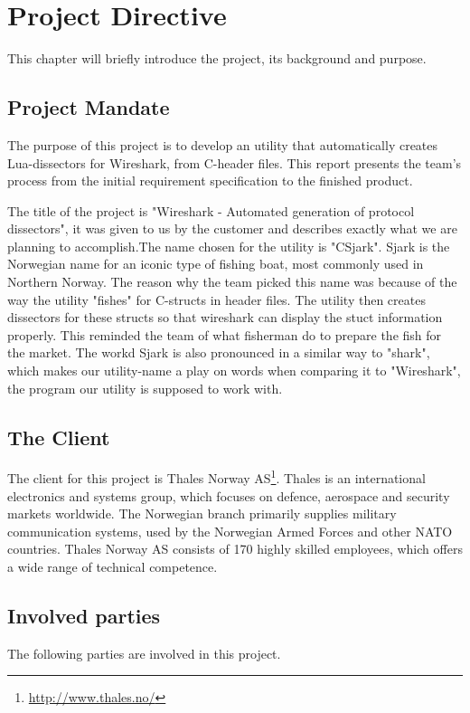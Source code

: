 \chapter{Project Directive}
This chapter will briefly introduce the project, its background and purpose.


\section{Project Mandate}
The purpose of this project is to develop an utility that automatically creates Lua-dissectors for Wireshark, from C-header files. This report presents the team’s process from the initial requirement specification to the finished product. 

The title of the project is "Wireshark - Automated generation of protocol dissectors", it was given to us by the customer and describes exactly what we are planning
to accomplish.The name chosen for the utility is "CSjark". Sjark is the Norwegian name for an iconic type of fishing boat, most commonly used in Northern Norway. The reason why the team picked this name was because of the way the utility "fishes" for C-structs in header files. The utility then creates dissectors for these structs so that wireshark can display the stuct information properly. This reminded the team of what fisherman do to prepare the fish for the market. The workd Sjark is also pronounced in a similar way to "shark", which makes our utility-name a play on words when comparing it to "Wireshark", the program our utility is supposed to work with.


\section{The Client}
The client for this project is
Thales Norway AS\footnote{\url{http://www.thales.no/}}. Thales is an
international electronics and systems group, which focuses on defence,
aerospace and security markets worldwide. The Norwegian branch primarily
supplies military communication systems, used by the Norwegian Armed Forces
and other NATO countries. Thales Norway AS consists of 170 highly skilled
employees, which offers a wide range of technical competence.

\section{Involved parties}
The following parties are involved in this project.


